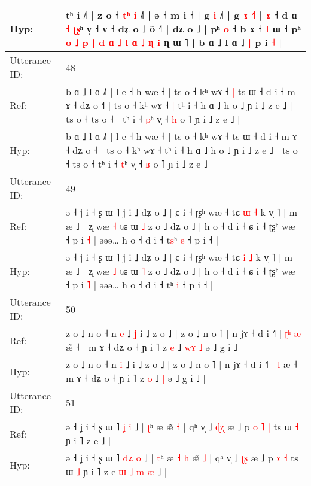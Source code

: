 \documentclass[10pt]{article}
\DeclareRobustCommand{\hl}[1]{{\textcolor{red}{#1}}}
\begin{document}
\begin{longtable}{ll}
 \\
Hyp: & tʰ i ˩˥ | z o ˧ \hl{t}\hl{ʰ} \hl{i} ˩\hl{˥} | ə ˧ m i ˧ | g \hl{i} ˩\hl{}\hl{}\hl{}\hl{}\hl{}˥ | g \hl{ɤ} \hl{˧}˥ |\hl{}\hl{}\hl{}\hl{}\hl{} \hl{ɤ} ˧ d ɑ \hl{˧} \hl{}\hl{ʈ}\hl{ʂ}ʰ v̩ ˧ v̩ ˧ dʑ o ˩\hl{}\hl{} õ ˧˥ | dʑ o ˩ | pʰ \hl{o} ˧ b ɤ ˧ \hl{l} ɯ ˧\hl{}\hl{} pʰ \hl{o} \hl{˩} \hl{p} \hl{|} \hl{d} \hl{ɑ} \hl{˩} \hl{l} \hl{ɑ} \hl{˩} \hl{ɳ} \hl{i} ɳ ɯ ˥ | b ɑ ˩ l ɑ ˩\hl{ }\hl{|} p i \hl{˧} |
 \\
\midrule
Utterance ID: & 48 \\
Ref: & b ɑ ˩ l ɑ ˩˥ | l e ˧ h wæ ˧ | ts o ˧ kʰ wɤ ˧\hl{ }\hl{|} ts ɯ ˧ d i ˧ m ɤ ˧ dʑ o ˧\hl{˥} | ts o ˧ kʰ wɤ ˧\hl{ }\hl{|} tʰ i ˧ h ɑ ˩ h o ˩ ɲ i ˩ z e ˩ | ts o ˧ ts o ˧\hl{ }\hl{|} tʰ i ˧ \hl{p}ʰ v̩ ˧ \hl{h} o ˥ ɲ i ˩ z e ˩ |
 \\
Hyp: & b ɑ ˩ l ɑ ˩˥ | l e ˧ h wæ ˧ | ts o ˧ kʰ wɤ ˧\hl{}\hl{} ts ɯ ˧ d i ˧ m ɤ ˧ dʑ o ˧\hl{} | ts o ˧ kʰ wɤ ˧\hl{}\hl{} tʰ i ˧ h ɑ ˩ h o ˩ ɲ i ˩ z e ˩ | ts o ˧ ts o ˧\hl{}\hl{} tʰ i ˧ \hl{t}ʰ v̩ ˧ \hl{ʁ} o ˥ ɲ i ˩ z e ˩ |
 \\
\midrule
Utterance ID: & 49 \\
Ref: & ə ˧ ʝ i ˧ ʂ ɯ ˥ ʝ i ˩ dʑ o ˩ | ɕ i ˧ ʈʂʰ wæ ˧ tɕ \hl{ɯ} \hl{˧} k v̩ ˥ | m æ ˩ | ʐ wæ \hl{˧} tɕ ɯ \hl{˩} z o ˩ dʑ o ˩ | h o ˧ d i ˧ ɕ i ˧ ʈʂʰ wæ ˧ p i \hl{˧} | əəə… h o ˧ d i ˧ t\hl{s}ʰ \hl{e} ˧ p i ˧ |
 \\
Hyp: & ə ˧ ʝ i ˧ ʂ ɯ ˥ ʝ i ˩ dʑ o ˩ | ɕ i ˧ ʈʂʰ wæ ˧ tɕ \hl{i} \hl{˩} k v̩ ˥ | m æ ˩ | ʐ wæ \hl{˩} tɕ ɯ \hl{˥} z o ˩ dʑ o ˩ | h o ˧ d i ˧ ɕ i ˧ ʈʂʰ wæ ˧ p i \hl{˥} | əəə… h o ˧ d i ˧ t\hl{}ʰ \hl{i} ˧ p i ˧ |
 \\
\midrule
Utterance ID: & 50 \\
Ref: & z o ˩ n o ˧ n \hl{e} ˩\hl{ }\hl{ʝ} i ˩ z o ˩ | z o ˩ n o ˥ | n jɤ ˧ d i ˧˥ |\hl{ }\hl{ʈ}\hl{ʰ} \hl{æ} æ\hl{̃} ˧\hl{ }\hl{|} m ɤ ˧ dʑ o ˧ ɲ i ˥ z \hl{e} ˩\hl{ }\hl{w}\hl{ɤ} \hl{˩} ə ˩ g i ˩ |
 \\
Hyp: & z o ˩ n o ˧ n \hl{i} ˩\hl{}\hl{} i ˩ z o ˩ | z o ˩ n o ˥ | n jɤ ˧ d i ˧˥ |\hl{}\hl{}\hl{} \hl{l} æ\hl{} ˧\hl{}\hl{} m ɤ ˧ dʑ o ˧ ɲ i ˥ z \hl{o} ˩\hl{}\hl{}\hl{} \hl{|} ə ˩ g i ˩ |
 \\
\midrule
Utterance ID: & 51 \\
Ref: & ə ˧ ʝ i ˧ ʂ ɯ ˥ \hl{}\hl{ʝ} \hl{i} ˩ | \hl{ʈ}ʰ æ\hl{}\hl{}\hl{}\hl{} æ̃ \hl{˧} | qʰ v̩ ˩ \hl{ɖ}\hl{ʐ} æ ˩ p\hl{ }\hl{o} \hl{˥} \hl{|} ts ɯ \hl{˧} ɲ i ˥ z e\hl{}\hl{}\hl{}\hl{}\hl{}\hl{}\hl{}\hl{} ˩ |
 \\
Hyp: & ə ˧ ʝ i ˧ ʂ ɯ ˥ \hl{d}\hl{ʑ} \hl{o} ˩ | \hl{t}ʰ æ\hl{ }\hl{˧}\hl{ }\hl{h} æ̃ \hl{˩} | qʰ v̩ ˩ \hl{ʈ}\hl{ʂ} æ ˩ p\hl{}\hl{} \hl{ɤ} \hl{˧} ts ɯ \hl{˩} ɲ i ˥ z e\hl{ }\hl{ɯ}\hl{ }\hl{˩}\hl{ }\hl{m}\hl{ }\hl{æ} ˩ |

\end{longtable}
\end{document}
